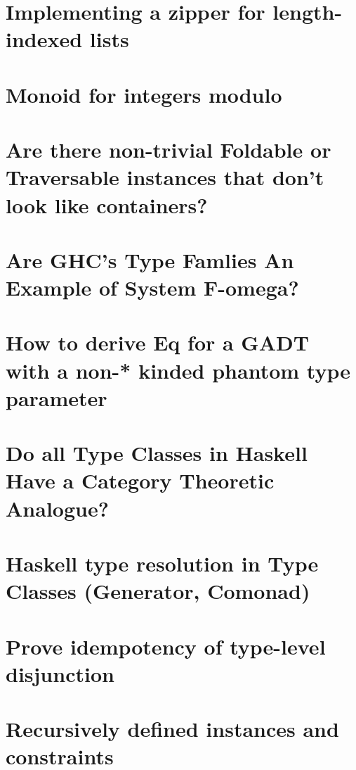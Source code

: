 \documentclass{book}%
\begin{document}
\section{Implementing a zipper for length-indexed lists}


\section{Monoid for integers modulo}


\section{Are there non-trivial Foldable or Traversable instances that don't look like containers?}


\section{Are GHC's Type Famlies An Example of System F-omega?}


\section{How to derive Eq for a GADT with a non-* kinded phantom type parameter}


\section{Do all Type Classes in Haskell Have a Category Theoretic Analogue?}


\section{Haskell type resolution in Type Classes (Generator, Comonad)}


\section{Prove idempotency of type-level disjunction}


\section{Recursively defined instances and constraints}

\end{document}
